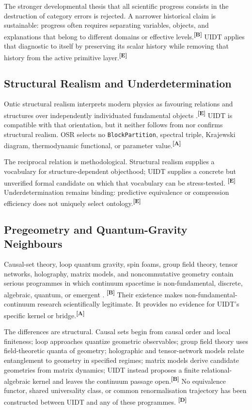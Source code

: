 \documentclass[12pt,a4paper,twoside]{article}
\theoremstyle{plain}
\theoremstyle{definition}
\theoremstyle{remark}
\newcommand{\catmark}[1]{\textsuperscript{\textsf{\textbf{[#1]}}}}
\begin{document}
The stronger developmental thesis that all scientific progress consists in the
destruction of category errors is rejected. A narrower historical claim is
sustainable: progress often requires separating variables, objects, and
explanations that belong to different domains or effective levels.\catmark{B}
UIDT applies that diagnostic to itself by preserving its scalar history while
removing that history from the active primitive layer.\catmark{E}

\subsection{Structural Realism and Underdetermination}
\label{subsec:ctx-structural-realism}

Ontic structural realism interprets modern physics as favouring relations and
structures over independently individuated fundamental objects
\cite{frenchladyman2003,ladymanross2007}.\catmark{E} UIDT is compatible with
that orientation, but it neither follows from nor confirms structural realism.
OSR selects no \texttt{BlockPartition}, spectral triple, Krajewski diagram,
thermodynamic functional, or parameter value.\catmark{A}

The reciprocal relation is methodological. Structural realism supplies a
vocabulary for structure-dependent objecthood; UIDT supplies a concrete but
unverified formal candidate on which that vocabulary can be stress-tested.
\catmark{E} Underdetermination remains binding: predictive equivalence or
compression efficiency does not uniquely select ontology.\catmark{E}

\subsection{Pregeometry and Quantum-Gravity Neighbours}
\label{subsec:ctx-qg-neighbours}

Causal-set theory, loop quantum gravity, spin foams, group field theory, tensor
networks, holography, matrix models, and noncommutative geometry contain serious
programmes in which continuum spacetime is non-fundamental, discrete,
algebraic, quantum, or emergent
\cite{bombelli1987,sorkin2003,rovelli2011,gielen2016,swingle2012,vanraamsdonk2010,ikkt1997,steinacker2010}.
\catmark{B} Their existence makes non-fundamental-continuum research
scientifically legitimate. It provides no evidence for UIDT's specific kernel
or bridge.\catmark{A}

The differences are structural. Causal sets begin from causal order and local
finiteness; loop approaches quantize geometric observables; group field theory
uses field-theoretic quanta of geometry; holographic and tensor-network models
relate entanglement to geometry in specified regimes; matrix models derive
candidate geometries from matrix dynamics; UIDT instead proposes a finite
relational-algebraic kernel and leaves the continuum passage open.\catmark{B}
No equivalence functor, shared universality class, or common renormalisation
trajectory has been constructed between UIDT and any of these programmes.
\catmark{D}
\end{document}
